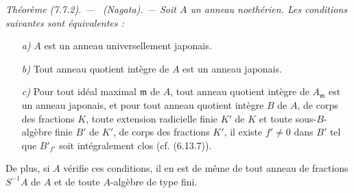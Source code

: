 \documentclass[10pt,oneside]{book}
\makeatletter
\newenvironment{theorem}[1][]{%
  \par\medskip\noindent\itshape Théorème (#1). ---\ }{\par}
\newcommand{\EGAReaderTarget}[2]{\hypertarget{#1}{}\@bsphack\begingroup\def\@currentHref{#1}\label{#2}\endgroup\@esphack}
\makeatother
\begin{document}
\begin{theorem}[7.7.2]
\EGAReaderTarget{ega4.c04.thm.7-7-2}{IV.2.s7.7.2-fr}
(Nagata). --- Soit $A$ un anneau noethérien. Les conditions suivantes sont
équivalentes :
\begin{enumerate}
\item[\emph{a)}] $A$ est un anneau universellement japonais.
\item[\emph{b)}] Tout anneau quotient intègre de $A$ est un anneau japonais.
\item[\emph{c)}] Pour tout idéal maximal $\mathfrak m$ de $A$, tout anneau
quotient intègre de $A_{\mathfrak m}$ est un anneau japonais, et pour tout
anneau quotient intègre $B$ de $A$, de corps des fractions $K$, toute
extension radicielle finie $K'$ de $K$ et toute sous-$B$-algèbre finie $B'$ de
$K'$, de corps des fractions $K'$, il existe $f'\neq0$ dans $B'$ tel que
$B'_{f'}$ soit intégralement clos (cf. (6.13.7)).
\end{enumerate}
De plus, si $A$ vérifie ces conditions, il en est de même de tout anneau de
fractions $S^{-1}A$ de $A$ et de toute $A$-algèbre de type fini.
\end{theorem}
\end{document}
